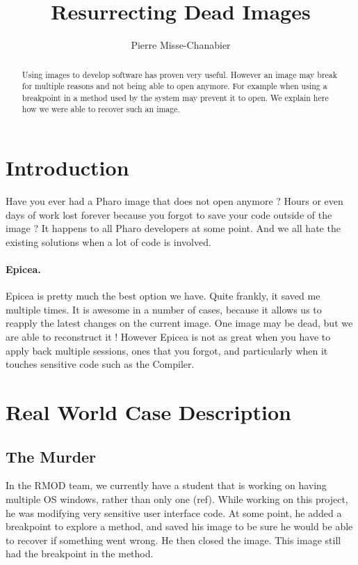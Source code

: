 \documentclass{article}
\title{Resurrecting Dead Images}
\author{Pierre Misse-Chanabier}
\begin{document}
\maketitle

\begin{abstract}
Using images to develop software has proven very useful.
However an image may break for multiple reasons and not being able to open anymore.
For example when using a breakpoint in a method used by the system may prevent it to open.
We explain here how we were able to recover such an image.
\end{abstract}

\section{Introduction}

Have you ever had a Pharo image that does not open anymore ?
Hours or even days of work lost forever because you forgot to save your code outside of the image ?
It happens to all Pharo developers at some point.
And we all hate the existing solutions when a lot of code is involved.

\paragraph{Epicea.} Epicea is pretty much the best option we have.
Quite frankly, it saved me multiple times.
It is awesome in a number of cases, because it allows us to reapply the latest changes on the current image.
One image may be dead, but we are able to reconstruct it !
However Epicea is not as great when you have to apply back multiple sessions, ones that you forgot, and particularly when it touches sensitive code such as the Compiler.

\section{Real World Case Description}

\subsection{The Murder}

In the RMOD team, we currently have a student that is working on having multiple OS windows, rather than only one (ref).
While working on this project, he was modifying very sensitive user interface code.
At some point, he added a breakpoint to explore a method, and saved his image to be sure he would be able to recover if something went wrong.
He then closed the image.
This image still had the breakpoint in the method.
\end{document}
